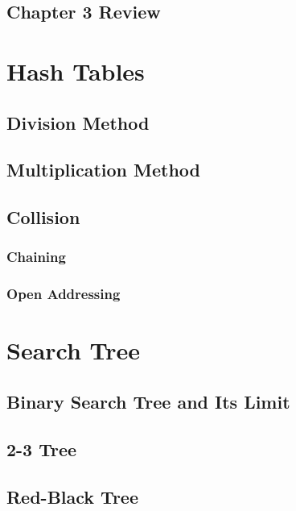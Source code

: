 \documentclass{report}
\begin{document}
\section{Chapter 3 Review}


\chapter{Hash Tables}

\section{Division Method}

\section{Multiplication Method}

\section{Collision}

\subsection{Chaining}

\subsection{Open Addressing}


\chapter{Search Tree}

\section{Binary Search Tree and Its Limit}

\section{2-3 Tree}

\section{Red-Black Tree}
\end{document}
